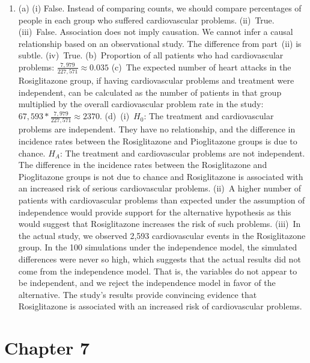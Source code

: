 \documentclass[
  10pt,
  openany]{book}
\begin{document}
\begin{enumerate}
  \addtocounter{enumi}{1}
\item
  (a) (i) False. Instead of comparing counts, we should compare percentages of people in each group who suffered cardiovascular problems. (ii)~True. (iii)~False. Association does not imply causation. We cannot infer a causal relationship based on an observational study. The difference from part~(ii) is subtle. (iv)~True. (b)~Proportion of all patients who had cardiovascular problems: \(\frac{7,979}{227,571} \approx 0.035\) (c)~The expected number of heart attacks in the Rosiglitazone group, if having cardiovascular problems and treatment were independent, can be calculated as the number of patients in that group multiplied by the overall cardiovascular problem rate in the study: \(67,593 * \frac{7,979}{227,571} \approx 2370\). (d)~(i)~\(H_0\): The treatment and cardiovascular problems are independent. They have no relationship, and the difference in incidence rates between the Rosiglitazone and Pioglitazone groups is due to chance. \(H_A\): The treatment and cardiovascular problems are not independent. The difference in the incidence rates between the Rosiglitazone and Pioglitazone groups is not due to chance and Rosiglitazone is associated with an increased risk of serious cardiovascular problems. (ii)~A higher number of patients with cardiovascular problems than expected under the assumption of independence would provide support for the alternative hypothesis as this would suggest that Rosiglitazone increases the risk of such problems. (iii)~In the actual study, we observed 2,593 cardiovascular events in the Rosiglitazone group. In the 100 simulations under the independence model, the simulated differences were never so high, which suggests that the actual results did not come from the independence model. That is, the variables do not appear to be independent, and we reject the independence model in favor of the alternative. The study's results provide convincing evidence that Rosiglitazone is associated with an increased risk of cardiovascular problems.

  \addtocounter{enumi}{1}
\end{enumerate}

\hypertarget{exercise-solutions-12}{%
\section{Chapter 7}\label{exercise-solutions-12}}
\end{document}
